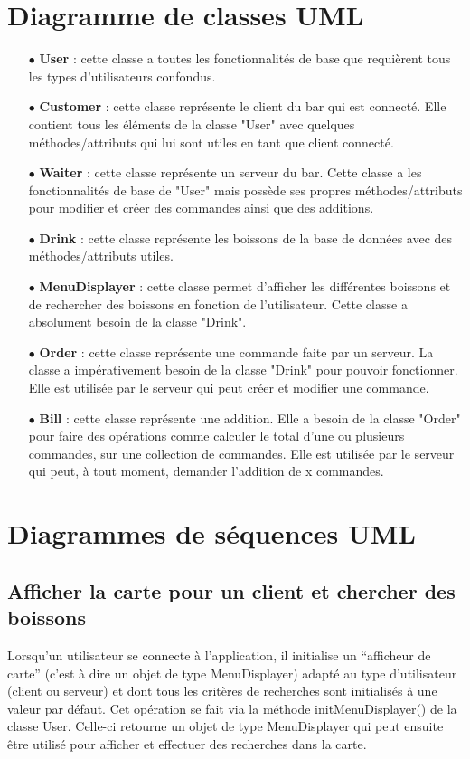 


\section{Diagramme de classes UML}
\begin{itemize}
	\item[{$\bullet$}] \textbf{User} : cette classe a toutes les fonctionnalités de base que requièrent
	tous les types d'utilisateurs confondus.
	\item[{$\bullet$}] \textbf{Customer} : cette classe représente le client du bar qui est connecté.
	Elle contient tous les éléments de la classe "User" avec quelques méthodes/attributs qui lui sont utiles
	en tant que client connecté.
	\item[{$\bullet$}] \textbf{Waiter} : cette classe représente un serveur du bar. Cette classe a les
	fonctionnalités de base de "User" mais possède ses propres méthodes/attributs pour modifier et créer
	des commandes ainsi que des additions.
	\item[{$\bullet$}] \textbf{Drink} : cette classe représente les boissons de la base de données avec
	des méthodes/attributs utiles. 
	\item[{$\bullet$}] \textbf{MenuDisplayer} : cette classe permet d'afficher les
	différentes boissons et de rechercher des boissons en fonction de l'utilisateur. Cette classe a
	absolument besoin de la classe "Drink".
	\item[{$\bullet$}] \textbf{Order} : cette classe représente une commande faite par un serveur. La
	classe a impérativement besoin de la classe "Drink" pour pouvoir fonctionner. Elle est utilisée par
	le serveur qui peut créer et modifier une commande.
	\item[{$\bullet$}] \textbf{Bill} : cette classe représente une addition. Elle a besoin de
	la classe "Order" pour faire des opérations comme calculer le total d'une ou plusieurs
	commandes, sur une collection de commandes. Elle est utilisée par le serveur qui peut, à tout moment,
	demander l'addition de x commandes.
\end{itemize}
\section{Diagrammes de séquences UML}
\subsection{Afficher la carte pour un client et chercher des boissons}
Lorsqu'un utilisateur se connecte à l'application, il initialise un ``afficheur
de carte'' (c'est à dire un objet de type MenuDisplayer) adapté au type
d'utilisateur (client ou serveur) et dont tous les critères de recherches
sont initialisés à une valeur par défaut. Cet opération se fait via la méthode
initMenuDisplayer() de la classe User. Celle-ci retourne un objet de type
 MenuDisplayer qui peut ensuite être utilisé pour afficher et effectuer
des recherches dans la carte.

